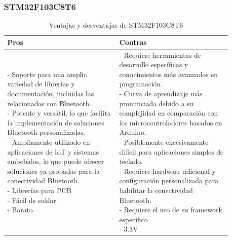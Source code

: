 \subsubsection{STM32F103C8T6}
\begin{table}[H]
\centering
\small
\begin{tabular}{|p{0.45\linewidth}|p{0.45\linewidth}|}
\hline
\textbf{Pros} &
\textbf{Contras} \\
\hline
\parbox[t]{\linewidth}{
\vspace{0.1cm}
- Soporte para una amplia variedad de librerías y documentación, incluidas las relacionadas con \gls{Bluetooth}. \medskip \\
- Potente y versátil, lo que facilita la implementación de soluciones \gls{Bluetooth} personalizadas. \medskip \\
- Ampliamente utilizado en aplicaciones de \gls{IoT} y sistemas embebidos, lo que puede ofrecer soluciones ya probadas para la conectividad \gls{Bluetooth}. \medskip \\
- Librerías para \gls{PCB} \medskip \\
- Fácil de soldar \medskip \\
- Barato
} &
\parbox[t]{\linewidth}{
\vspace{0.1cm}
- Requiere herramientas de desarrollo específicas y conocimientos más avanzados en programación. \medskip \\
- Curva de aprendizaje más pronunciada debido a su complejidad en comparación con los microcontroladores basados en \gls{Arduino}. \medskip \\
- Posiblemente excesivamente difícil para aplicaciones simples de teclado. \medskip \\
- Requiere hardware adicional y configuración personalizada para habilitar la conectividad \gls{Bluetooth}. \medskip \\
- Requiere el uso de su framework específico  \medskip \\
- 3.3V} \medskip \\
\hline
\end{tabular}
\caption{Ventajas y desventajas de STM32F103C8T6}
\end{table}

